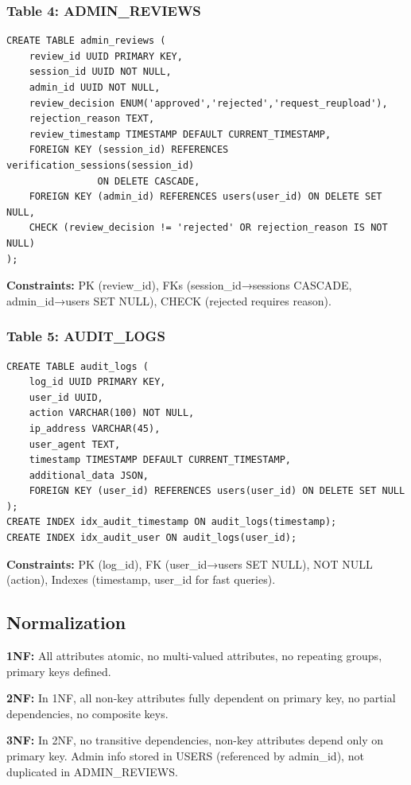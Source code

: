 \documentclass[12pt,a4paper]{article}
\begin{document}
\subsubsection{Table 4: ADMIN\_REVIEWS}
\begin{verbatim}
CREATE TABLE admin_reviews (
    review_id UUID PRIMARY KEY,
    session_id UUID NOT NULL,
    admin_id UUID NOT NULL,
    review_decision ENUM('approved','rejected','request_reupload'),
    rejection_reason TEXT,
    review_timestamp TIMESTAMP DEFAULT CURRENT_TIMESTAMP,
    FOREIGN KEY (session_id) REFERENCES verification_sessions(session_id)
                ON DELETE CASCADE,
    FOREIGN KEY (admin_id) REFERENCES users(user_id) ON DELETE SET NULL,
    CHECK (review_decision != 'rejected' OR rejection_reason IS NOT NULL)
);
\end{verbatim}
\textbf{Constraints:} PK (review\_id), FKs (session\_id→sessions CASCADE, admin\_id→users SET NULL), CHECK (rejected requires reason).

\subsubsection{Table 5: AUDIT\_LOGS}
\begin{verbatim}
CREATE TABLE audit_logs (
    log_id UUID PRIMARY KEY,
    user_id UUID,
    action VARCHAR(100) NOT NULL,
    ip_address VARCHAR(45),
    user_agent TEXT,
    timestamp TIMESTAMP DEFAULT CURRENT_TIMESTAMP,
    additional_data JSON,
    FOREIGN KEY (user_id) REFERENCES users(user_id) ON DELETE SET NULL
);
CREATE INDEX idx_audit_timestamp ON audit_logs(timestamp);
CREATE INDEX idx_audit_user ON audit_logs(user_id);
\end{verbatim}
\textbf{Constraints:} PK (log\_id), FK (user\_id→users SET NULL), NOT NULL (action), Indexes (timestamp, user\_id for fast queries).

\subsection{Normalization}

\textbf{1NF:} All attributes atomic, no multi-valued attributes, no repeating groups, primary keys defined.

\textbf{2NF:} In 1NF, all non-key attributes fully dependent on primary key, no partial dependencies, no composite keys.

\textbf{3NF:} In 2NF, no transitive dependencies, non-key attributes depend only on primary key. Admin info stored in USERS (referenced by admin\_id), not duplicated in ADMIN\_REVIEWS.
\end{document}
